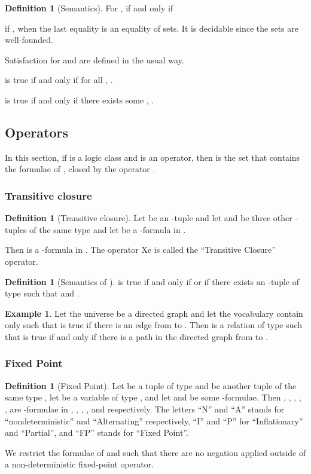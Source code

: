 \documentclass[a4paper,12pt]{article}
\newcommand{\sss}[1]{\subsubsection{#1}}
\newcommand{\emphdex}[1]{\index{#1}\emph{#1}}
\theoremstyle{definition}
\newtheorem{example}[theorem]{Example}
\newtheorem{definition}[theorem]{Definition}
\begin{document}
\begin{definition}[Semantics]
  For ,  if and only if
  

   if , when the last
  equality is an equality of sets. It is decidable since the sets are
  well-founded.

  Satisfaction for  and  are
  defined in the usual way.

   is true if and
  only if for all , . 

   is true if and only
  if there exists some , .
\end{definition}
\subsection{Operators}
In this section, if  is a logic class and  is an operator, then
\emphdex{} is the set  that contains the formulae of , closed
by the operator .

\sss{Transitive closure}
\begin{definition}[Transitive closure]


  Let  be an -tuple
  and let  and  be three other
  -tuples of the same type and let  be a -formula in .

  Then  is a
  -formula in . The operator \TC{}Xe is called the
  ``Transitive Closure'' operator.

\end{definition}
\begin{definition}[Semantics of \TC]
   is true if and only
  if  or if there exists an -tuple 
  of type  such that  and .\end{definition}



\begin{example}
  Let the universe be a directed graph and let the vocabulary contain
  only  such that  is true if there is an edge from  to
  . Then  is a relation of type
   such that  is true if and only if there
  is a path  in the directed graph from  to .
\end{example}

\sss{Fixed Point}
\begin{definition}[Fixed Point]
  Let  be a tuple of
  type  and  be another tuple of the same type ,
  let  be a variable of type , and let
   and  be some -formulae. Then ,
  , , 
  , ,  are -formulae in
  \emphdex{}, \emphdex{}, \emphdex{},
  \emphdex{}, \emphdex{} and \emphdex{}
  respectively. The letters ``N'' and ``A'' stands for
  ``nondeterministic'' and ``Alternating'' respectively, ``I'' and
  ``P'' for ``Inflationary'' and ``Partial'', and ``FP'' stands for
  ``Fixed Point''.



  We restrict the formulae of  and \NPFP{} such that there are no
  negation applied outside of a non-deterministic fixed-point
  operator.
\end{definition}
\end{document}
